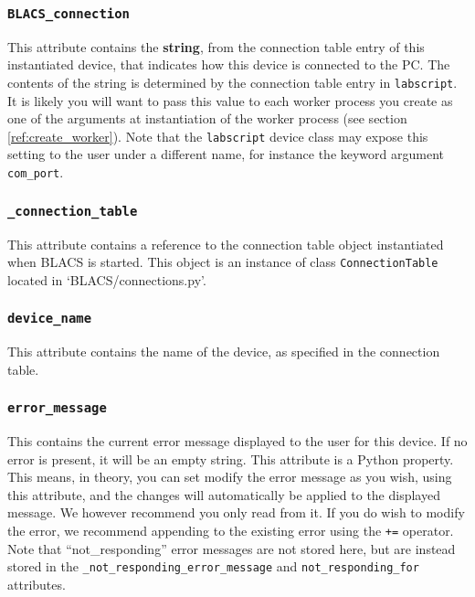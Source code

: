 \documentclass[12pt]{article}
\begin{document}
\subsubsection{\texttt{BLACS\_connection}}\label{ref:BLACS_connection}
This attribute contains the \textbf{string}, from the connection table entry of this instantiated device, that indicates how this device is connected to the PC. 
The contents of the string is determined by the connection table entry in \texttt{labscript}.
It is likely you will want to pass this value to each worker process you create as one of the arguments at instantiation of the worker process (see section \ref{ref:create_worker}).
Note that the \texttt{labscript} device class may expose this setting to the user under a different name, for instance the keyword argument \texttt{com\_port}.

\subsubsection{\texttt{\_connection\_table}}\label{ref:_connection_table}
This attribute contains a reference to the connection table object instantiated when BLACS is started.
This object is an instance of class \texttt{ConnectionTable} located in `BLACS/connections.py'.

\subsubsection{\texttt{device\_name}}\label{ref:device_name}
This attribute contains the name of the device, as specified in the connection table.

\subsubsection{\texttt{error\_message}}\label{ref:error_message}
This contains the current error message displayed to the user for this device.
If no error is present, it will be an empty string.
This attribute is a Python property. 
This means, in theory, you can set modify the error message as you wish, using this attribute, and the changes will automatically be applied to the displayed message.
We however recommend you only read from it.
If you do wish to modify the error, we recommend appending to the existing error using the \texttt{+=} operator.
Note that ``not\_responding'' error messages are not stored here, but are instead stored in the \texttt{\_not\_responding\_error\_message} and \texttt{not\_responding\_for} attributes.
\end{document}
